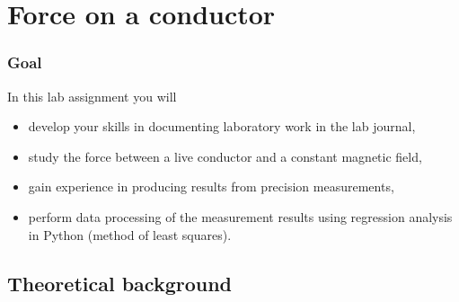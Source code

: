 \documentclass[../Elmag-labhefte-2020.tex]{subfiles}
\begin{document}
\setchapterpreamble[u]{\margintoc}
\chapter{Force on a conductor\label{ch.kraft}}

\subsection*{Goal}

In this lab assignment you will
%
\begin{itemize}
\item develop your skills in documenting laboratory work in the lab journal,
\item study the force between a live conductor and a constant magnetic field,
\item gain experience in producing results from precision measurements,
\item perform data processing of the measurement results using regression analysis in Python (method of least squares). %
\end{itemize}
%


\section{Theoretical background}



\end{document}
